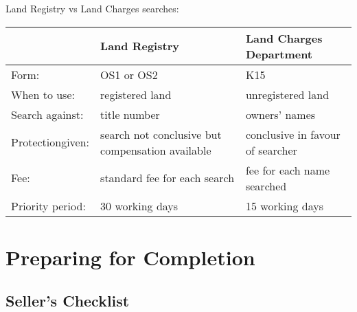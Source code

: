 \documentclass[
]{article}
\begin{document}
Land Registry vs Land Charges searches:

\begin{longtable}[]{@{}lll@{}}
\toprule()
& Land Registry & Land Charges Department \\
\midrule()
\endhead
Form: & OS1 or OS2 & K15 \\
When to use: & registered land & unregistered land \\
Search against: & title number & owners' names \\
Protectiongiven: & search not conclusive but compensation available &
conclusive in favour of searcher \\
Fee: & standard fee for each search & fee for each name searched \\
Priority period: & 30 working days & 15 working days \\
\bottomrule()
\end{longtable}

\hypertarget{preparing-for-completion}{%
\section{Preparing for Completion}\label{preparing-for-completion}}

\hypertarget{sellers-checklist}{%
\subsection{Seller's Checklist}\label{sellers-checklist}}
\end{document}
